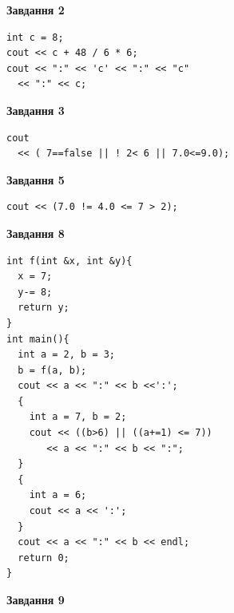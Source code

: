 \documentclass[12pt, ukrainian]{article}
\begin{document}
{\begin {large}
\begin{minipage}[t]{7.0cm}
\end{minipage}
\vline \hspace{1mm}
\begin{minipage}[t]{11.0cm}

\begin{center}
\textbf{Завдання 2}
\end{center}
\vspace{-8mm}

\begin{verbatim}
int c = 8;
cout << c + 48 / 6 * 6;
cout << ":" << 'c' << ":" << "c" 
  << ":" << c;
\end{verbatim}



\begin{center}
\textbf{Завдання 3}
\end{center}
\vspace{-8mm}

\begin{verbatim}
cout 
  << ( 7==false || ! 2< 6 || 7.0<=9.0);
\end{verbatim}



\begin{center}
\textbf{Завдання 5}
\end{center}
\vspace{-8mm}

\begin{verbatim}
cout << (7.0 != 4.0 <= 7 > 2);
\end{verbatim}



\begin{center}
\textbf{Завдання 8}
\end{center}
\vspace{-8mm}

\begin{verbatim}
int f(int &x, int &y){
  x = 7;
  y-= 8;
  return y;
}
int main(){
  int a = 2, b = 3;
  b = f(a, b);
  cout << a << ":" << b <<':';
  {
    int a = 7, b = 2;
    cout << ((b>6) || ((a+=1) <= 7))
       << a << ":" << b << ":";
  }
  {
    int a = 6;
    cout << a << ':';
  }
  cout << a << ":" << b << endl;
  return 0;
}
\end{verbatim}

\end{minipage}


\begin{minipage}[t]{7.0cm}

\begin{center}
\textbf{Завдання 9}
\end{center}
\vspace{-8mm}


\end{minipage}
\end{large}}
\end{document}
